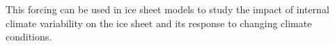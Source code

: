 This forcing can be used in ice sheet models to study the impact of internal climate variability on the ice sheet and its response to changing climate conditions.
